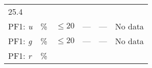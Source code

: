 \documentclass[DM,lsstdraft,toc]{lsstdoc}
\begin{document}
\begin{longtable}[]{@{}llllll@{}}
\begin{minipage}[t]{0.12\columnwidth}
25.4\strut
\end{minipage} & \begin{minipage}[t]{0.17\columnwidth}\raggedright\strut
\strut
\end{minipage}\tabularnewline
\begin{minipage}[t]{0.14\columnwidth}\raggedright\strut
PF1: \emph{u}\strut
\end{minipage} & \begin{minipage}[t]{0.06\columnwidth}\raggedright\strut
\%\strut
\end{minipage} & \begin{minipage}[t]{0.17\columnwidth}\raggedright\strut
\(\leq 20\)\strut
\end{minipage} & \begin{minipage}[t]{0.17\columnwidth}\raggedright\strut
---\strut
\end{minipage} & \begin{minipage}[t]{0.12\columnwidth}\raggedright\strut
---\strut
\end{minipage} & \begin{minipage}[t]{0.17\columnwidth}\raggedright\strut
No data\strut
\end{minipage}\tabularnewline
\begin{minipage}[t]{0.14\columnwidth}\raggedright\strut
PF1: \emph{g}\strut
\end{minipage} & \begin{minipage}[t]{0.06\columnwidth}\raggedright\strut
\%\strut
\end{minipage} & \begin{minipage}[t]{0.17\columnwidth}\raggedright\strut
\(\leq 20\)\strut
\end{minipage} & \begin{minipage}[t]{0.17\columnwidth}\raggedright\strut
---\strut
\end{minipage} & \begin{minipage}[t]{0.12\columnwidth}\raggedright\strut
---\strut
\end{minipage} & \begin{minipage}[t]{0.17\columnwidth}\raggedright\strut
No data\strut
\end{minipage}\tabularnewline
\begin{minipage}[t]{0.14\columnwidth}\raggedright\strut
PF1: \emph{r}\strut
\end{minipage} & \begin{minipage}[t]{0.06\columnwidth}\raggedright\strut
\%\strut
\end{minipage} & \begin{minipage}[t]{0.17\columnwidth}\raggedright\strut

\end{minipage}
\end{longtable}
\end{document}
